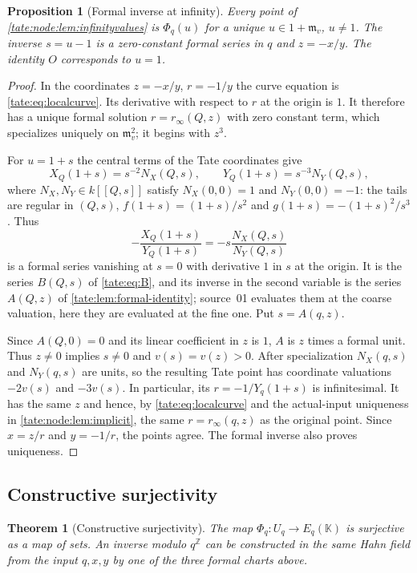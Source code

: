 \documentclass[11pt,letterpaper]{article}
\newtheorem{theorem}{Theorem}[section]
\newtheorem{proposition}[proposition]{Proposition}
\theoremstyle{definition}
\newcommand{\Z}{\mathbb Z}
\newcommand{\m}{\mathfrak m}
\newcommand{\KK}{\mathbb K}
\begin{document}
\begin{proposition}[Formal inverse at infinity]\label{tate:node:prop:infinity}
Every point of \cref{tate:node:lem:infinityvalues} is $\Phi_q(u)$ for a
unique $u\in1+\m_v$, $u\ne1$. The inverse $s=u-1$ is a zero-constant
formal series in $q$ and $z=-x/y$. The identity $O$ corresponds to $u=1$.
\end{proposition}

\begin{proof}
In the coordinates $z=-x/y$, $r=-1/y$ the curve equation is
\eqref{tate:eq:localcurve}. Its derivative with respect to $r$ at the
origin is $1$. It therefore has a unique formal solution $r=r_\infty(Q,z)$
with zero constant term, which specializes uniquely on $\m_v^2$; it begins
with $z^3$.

For $u=1+s$ the central terms of the Tate coordinates give
\[
 X_Q(1+s)=s^{-2}N_X(Q,s),\qquad Y_Q(1+s)=s^{-3}N_Y(Q,s),
\]
where $N_X,N_Y\in k[[Q,s]]$ satisfy $N_X(0,0)=1$ and $N_Y(0,0)=-1$:
the tails are regular in $(Q,s)$, $f(1+s)=(1+s)/s^2$ and
$g(1+s)=-(1+s)^2/s^3$. Thus
\[
 -\frac{X_Q(1+s)}{Y_Q(1+s)}=-s\frac{N_X(Q,s)}{N_Y(Q,s)}
\]
is a formal series vanishing at $s=0$ with derivative $1$ in $s$ at the
origin. It is the series $B(Q,s)$ of \eqref{tate:eq:B}, and its inverse in
the second variable is the series $A(Q,z)$ of \cref{tate:lem:formal-identity};
source~01 evaluates them at the coarse valuation, here they are evaluated
at the fine one. Put $s=A(q,z)$.

Since $A(Q,0)=0$ and its linear coefficient in $z$ is $1$, $A$ is $z$
times a formal unit. Thus $z\ne0$ implies $s\ne0$ and $v(s)=v(z)>0$.
After specialization $N_X(q,s)$ and $N_Y(q,s)$ are units, so the resulting
Tate point has coordinate valuations $-2v(s)$ and $-3v(s)$. In particular,
its $r=-1/Y_q(1+s)$ is infinitesimal. It has the same $z$ and hence, by
\eqref{tate:eq:localcurve} and the actual-input uniqueness in
\cref{tate:node:lem:implicit}, the same $r=r_\infty(q,z)$ as the original
point. Since $x=z/r$ and $y=-1/r$, the points agree. The formal inverse
also proves uniqueness.
\end{proof}

\subsection{Constructive surjectivity}

\begin{theorem}[Constructive surjectivity]\label{tate:node:thm:surjectivity}
The map $\Phi_q:U_q\to E_q(\KK)$ is surjective as a map of sets. An inverse
modulo $q^\Z$ can be constructed in the same Hahn field from the input
$q,x,y$ by one of the three formal charts above.
\end{theorem}
\end{document}
